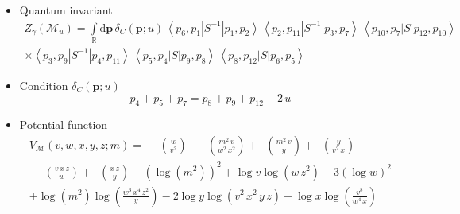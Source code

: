 \documentclass[12pt,reqno]{amsart}
\newcommand{\middle}{{}}
\numberwithin{equation}{section}
\DeclareMathOperator{\Li}{Li_2}
\begin{document}
\begin{itemize}

\item Quantum invariant
\begin{multline*}
  Z_\gamma \left( \mathcal{M}_u \right)
  =
  \int\limits_\mathbb{R}
  \mathrm{d} \boldsymbol{p} \,
  \delta_C(\boldsymbol{p}; u ) \,
  \left\langle
    p_6 , p_1 \middle| S^{-1} \middle| p_1 , p_2
  \right\rangle \,
  \left\langle
    p_2 , p_{11} \middle| S^{-1} \middle| p_3 , p_7
  \right\rangle \,
  \left\langle
    p_{10} , p_7 \middle| S \middle| p_{12} , p_{10}
  \right\rangle
  \\
  \times
  \left\langle
    p_{3} , p_9 \middle| S^{-1} \middle| p_4 , p_{11}
  \right\rangle \,
  \left\langle
    p_{5} , p_4 \middle| S \middle| p_9 , p_{8}
  \right\rangle \,
  \left\langle
    p_{8} , p_{12} \middle| S \middle| p_6 , p_{5}
  \right\rangle 
\end{multline*}


\item
Condition $\delta_C(\boldsymbol{p};u)$
\begin{equation*}
  p_4 + p_5 + p_7 = p_8 + p_9 + p_{12} - 2 \, u
\end{equation*}

\item Potential function
\begin{multline*}
  V_\mathcal{M}(v,w,x,y,z; m)
  =
  - \Li\left( \frac{w}{v^2} \right)
  - \Li\left( \frac{m^2 \, v}{w^2 \, x^2} \right)
  + \Li\left( \frac{m^2 \, v}{y} \right)
  + \Li\left( \frac{y}{v^2 \, x} \right)
  \\
  - \Li\left( \frac{v \, x \, z}{w} \right)
  + \Li\left( \frac{x \, z}{y} \right)
  - \left( \log \left( m^2 \right) \right)^2
  + \log v \log \left(w \, z^2\right)
  - 3 \left( \log w \right)^2
  \\
  +
  \log\left( m^2 \right) \log \left(\frac{w^3 \, x^4 \, z^2}{y}\right)
  -2 \log y \log \left( v^2 \, x^2 \, y \, z \right)
  + \log x \log \left( \frac{v^8}{w^4 \, x} \right)
\end{multline*}


\end{itemize}
\end{document}
